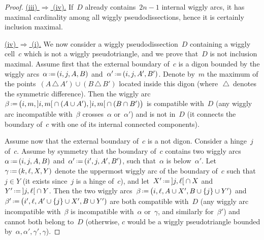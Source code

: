 \documentclass{amsart}
\theoremstyle{definition}
\newcommand{\symdif}{\,\triangle\,} %
\newcommand{\eqdef}{\mbox{\,\raisebox{0.2ex}{\scriptsize\ensuremath{\mathrm:}}\ensuremath{=}\,}} %
\newcommand{\ie}{\textit{i.e.}~} %
\newcommand{\para}[1]{\smallskip\noindent\uline{#1.}} %
\begin{document}
\begin{proof}
%

\para{(iii) $\Rightarrow$ (iv)}
If~$D$ already contains~$2n-1$ internal wiggly arcs, it has maximal cardinality among all wiggly pseudodissections, hence it is certainly inclusion maximal.

\para{(iv) $\Rightarrow$ (i)}
We now consider a wiggly pseudodissection~$D$ containing a wiggly cell~$c$ which is not a wiggly pseudotriangle, and we prove that~$D$ is not inclusion maximal.
%
Assume first that the external boundary of~$c$ is a digon bounded by the wiggly arcs~$\alpha \eqdef (i, j, A, B)$ and~$\alpha' \eqdef (i, j, A', B')$.
Denote by~$m$ the maximum of the points~$(A \symdif A') \cup (B \symdif B')$ located inside this digon (where~$\symdif$ denotes the symmetric difference).
Then the wiggly arc~$\beta \eqdef \big( i, m, {]i,m[} \cap (A \cup A'), {]i,m[} \cap (B \cap B') \big)$ is compatible with~$D$ (any wiggly arc incompatible with~$\beta$ crosses~$\alpha$ or~$\alpha'$) and is not in~$D$ (it connects the boundary of~$c$ with one of its internal connected components).

Assume now that the external boundary of~$c$ is a not digon.
Consider a hinge~$j$ of~$c$.
Assume by symmetry that the boundary of~$c$ contains two wiggly arcs~$\alpha \eqdef (i, j, A, B)$ and~$\alpha' \eqdef (i', j, A', B')$, such that~$\alpha$ is below~$\alpha'$. %
Let~$\gamma \eqdef (k, \ell, X, Y)$ denote the uppermost wiggly arc of the boundary of~$c$ such that~$j \in Y$ (it exists since~$j$ is a  hinge of~$c$), and let~$X' \eqdef {]j,\ell[} \cap X$ and~$Y' \eqdef {]j,\ell[} \cap Y$.
Then the two wiggly arcs~$\beta \eqdef \big( i, \ell, A \cup X', B \cup \{j\} \cup Y')$ and~$\beta' \eqdef \big( i', \ell, A'  \cup \{j\} \cup X', B \cup Y')$ are both compatible with~$D$ (any wiggly arc incompatible with~$\beta$ is incompatible with~$\alpha$ or~$\gamma$, and similarly for~$\beta'$) and cannot both belong to~$D$ (otherwise, $c$ would be a wiggly pseudotriangle bounded by~$\alpha, \alpha', \gamma', \gamma$).
\end{proof}
\end{document}
